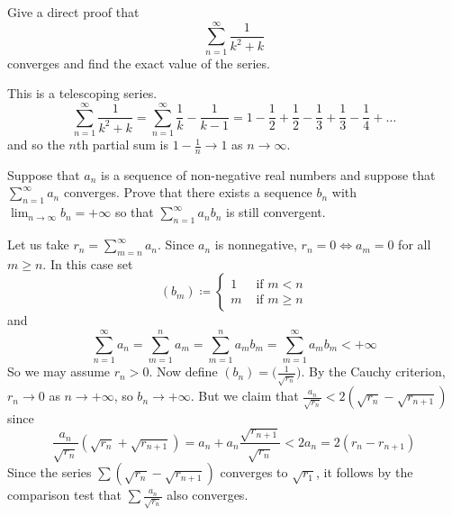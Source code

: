   \begin{exercise}
    Give a direct proof that
    \begin{equation}
      \sum_{n=1}^{\infty} \frac{1}{k^2+k}
    \end{equation}
    converges and find the exact value of the series.
  \end{exercise}
  \begin{solution}
    This is a telescoping series. 
    \begin{equation}
      \sum_{n=1}^\infty \frac{1}{k^2 + k} = \sum_{n=1}^\infty \frac{1}{k} - \frac{1}{k-1} = 1 - \frac{1}{2} + \frac{1}{2} - \frac{1}{3} + \frac{1}{3} - \frac{1}{4} + \ldots 
    \end{equation}
    and so the $n$th partial sum is $1 - \frac{1}{n} \to 1$ as $n \to \infty$. 
  \end{solution}

  \begin{exercise}
    Suppose that $a_n$ is a sequence of non-negative real numbers and suppose that $\sum_{n=1}^{\infty} a_n$ converges. Prove that there exists a sequence $b_n$ with $\lim_{n \to \infty} b_n = +\infty$ so that $\sum_{n=1}^{\infty} a_n b_n$ is still convergent.
  \end{exercise}
  \begin{solution}
    Let us take $r_n = \sum_{m=n}^\infty a_n$. Since $a_n$ is nonnegative, $r_n = 0 \iff a_m = 0$ for all $m \geq n$. In this case set 
    \begin{equation}
      (b_m) \coloneqq \begin{cases}
        1 & \text{ if } m < n \\ 
        m & \text{ if } m \geq n
      \end{cases}
    \end{equation}
    and 
    \begin{equation}
      \sum_{n=1}^\infty a_n = \sum_{m=1}^n a_m = \sum_{m=1}^n a_m b_m = \sum_{m=1}^\infty a_m b_m < +\infty 
    \end{equation}
    So we may assume $r_n > 0$. Now define $(b_n) = \big( \frac{1}{\sqrt{r_n}} \big)$. By the Cauchy criterion, $r_n \to 0$ as $n \to +\infty$, so $b_n \to +\infty$. But we claim that $\frac{a_n}{\sqrt{r_n}} < 2(\sqrt{r_n} - \sqrt{r_{n+1}})$ since 
    \begin{equation}
      \frac{a_n}{\sqrt{r_n}} (\sqrt{r_n} + \sqrt{r_{n+1}}) = a_n + a_n \frac{\sqrt{r_{n+1}}}{\sqrt{r_n}} < 2 a_n = 2(r_n - r_{n+1})  
    \end{equation}
    Since the series $\sum (\sqrt{r_n} - \sqrt{r_{n+1}})$ converges to $\sqrt{r_1}$, it follows by the comparison test that $\sum \frac{a_n}{\sqrt{r_n}}$ also converges. 
  \end{solution}

